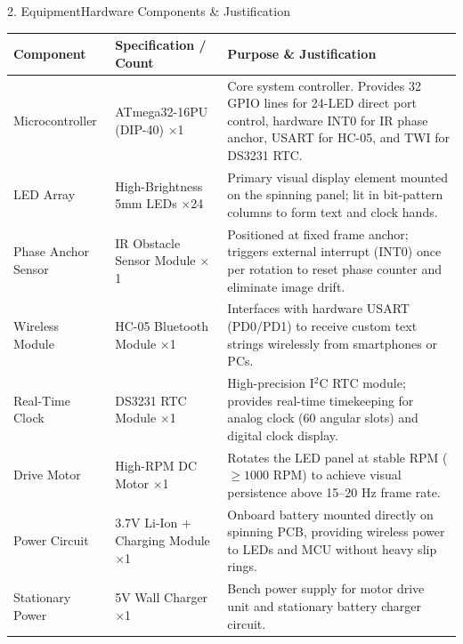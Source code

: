 \documentclass[aspectratio=169, 10pt]{beamer}
\begin{document}
\begin{frame}{2. Equipment}{Hardware Components \& Justification}
    \tiny
    \renewcommand{\arraystretch}{0.93}
    \begin{table}
        \centering
        \begin{tabular}{p{2.15cm} p{2.85cm} p{5.6cm}}
            \toprule
            \textbf{\color{Accent} Component} & \textbf{\color{Accent} Specification / Count} & \textbf{\color{Accent} Purpose \& Justification} \\
            \midrule
            Microcontroller & ATmega32-16PU (DIP-40) $\times$1 & Core system controller. Provides 32 GPIO lines for 24-LED direct port control, hardware INT0 for IR phase anchor, USART for HC-05, and TWI for DS3231 RTC. \\
            LED Array & High-Brightness 5mm LEDs $\times$24 & Primary visual display element mounted on the spinning panel; lit in bit-pattern columns to form text and clock hands. \\
            Phase Anchor Sensor & IR Obstacle Sensor Module $\times$1 & Positioned at fixed frame anchor; triggers external interrupt (INT0) once per rotation to reset phase counter and eliminate image drift. \\
            Wireless Module & HC-05 Bluetooth Module $\times$1 & Interfaces with hardware USART (PD0/PD1) to receive custom text strings wirelessly from smartphones or PCs. \\
            Real-Time Clock & DS3231 RTC Module $\times$1 & High-precision I$^2$C RTC module; provides real-time timekeeping for analog clock (60 angular slots) and digital clock display. \\
            Drive Motor & High-RPM DC Motor $\times$1 & Rotates the LED panel at stable RPM ($\ge 1000$ RPM) to achieve visual persistence above 15--20 Hz frame rate. \\
            Power Circuit & 3.7V Li-Ion + Charging Module $\times$1 & Onboard battery mounted directly on spinning PCB, providing wireless power to LEDs and MCU without heavy slip rings. \\
            Stationary Power & 5V Wall Charger $\times$1 & Bench power supply for motor drive unit and stationary battery charger circuit. \\
            \bottomrule
        \end{tabular}
    \end{table}
\end{frame}
\end{document}

